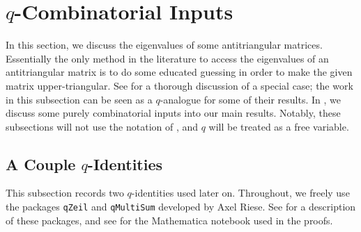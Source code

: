 
\section{\texorpdfstring{$q$}{q}-Combinatorial Inputs} \label{sec:qcombo}
In this section, we discuss the eigenvalues of some antitriangular matrices. Essentially the only method in the literature to access the eigenvalues of an antitriangular matrix is to do some educated guessing in order to make the given matrix upper-triangular. See \cite{britnell-antitriangular} for a thorough discussion of a special case; the work in this subsection can be seen as a $q$-analogue for some of their results. In , we discuss some purely combinatorial inputs into our main results. Notably, these subsections will not use the notation of , and $q$ will be treated as a free variable.

\subsection{A Couple \texorpdfstring{$q$}{q}-Identities} \label{subsec:q-ids}
This subsection records two $q$-identities used later on. Throughout, we freely use the packages \texttt{qZeil} and \texttt{qMultiSum} developed by Axel Riese. See \cite{riese-zeil,riese-multisum} for a description of these packages, and see \cite{qmultisum-code} for the Mathematica notebook used in the proofs.

